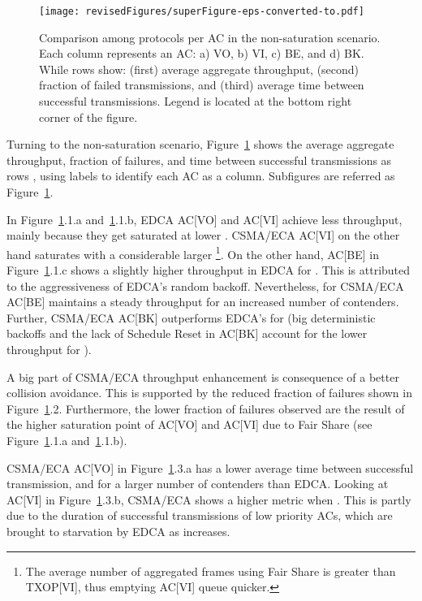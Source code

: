 \documentclass[a4paper]{article}
\begin{document}
	\begin{figure}[t]
	\centering
		\texttt{[image: revisedFigures/superFigure-eps-converted-to.pdf]}
		\caption{Comparison among protocols per AC in the non-saturation scenario. Each column represents an AC: a) VO, b) VI, c) BE, and d) BK. While rows show: (first) average aggregate throughput, (second) fraction of failed transmissions, and (third) average time between successful transmissions. Legend is located at the bottom right corner of the figure.}
		\label{fig:unsat}
	\end{figure}

Turning to the non-saturation scenario, Figure~\ref{fig:unsat} shows the average aggregate throughput, fraction of failures, and time between successful transmissions as rows , using labels  to identify each AC as a column. Subfigures are referred as Figure~\ref{fig:unsat}. 

In Figure~\ref{fig:unsat}.1.a and~\ref{fig:unsat}.1.b, EDCA AC[VO] and AC[VI] achieve less throughput, mainly because they get saturated at lower . CSMA/ECA AC[VI] on the other hand saturates with a considerable larger \footnote{The average number of aggregated frames using Fair Share is greater than TXOP[VI], thus emptying AC[VI] queue quicker.}. On the other hand, AC[BE] in Figure~\ref{fig:unsat}.1.c shows a slightly higher throughput in EDCA for . This is attributed to the aggressiveness of EDCA's random backoff. Nevertheless, for  CSMA/ECA AC[BE] maintains a steady throughput for an increased number of contenders. Further, CSMA/ECA AC[BK] outperforms EDCA's for  (big deterministic backoffs and the lack of Schedule Reset in AC[BK] account for the lower throughput for ).



A big part of CSMA/ECA throughput enhancement is consequence of a better collision avoidance. This is supported by the reduced fraction of failures shown in Figure~\ref{fig:unsat}.2. Furthermore, the lower fraction of failures observed are the result of the higher saturation point of AC[VO] and AC[VI] due to Fair Share (see Figure~\ref{fig:unsat}.1.a and~\ref{fig:unsat}.1.b).
	
CSMA/ECA AC[VO] in Figure~\ref{fig:unsat}.3.a has a lower average time between successful transmission, and for a larger number of contenders than EDCA. Looking at AC[VI] in Figure~\ref{fig:unsat}.3.b, CSMA/ECA shows a higher metric when . This is partly due to the duration of successful transmissions of low priority ACs, which are brought to starvation by EDCA as  increases. 
\end{document}
